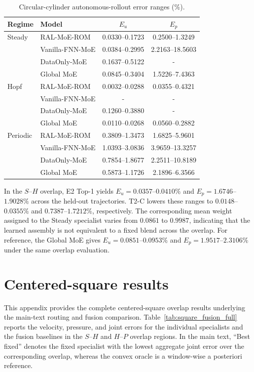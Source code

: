 \documentclass{article}
\begin{document}
\par
\begin{table}[H]
\centering
\caption{Circular-cylinder autonomous-rollout error ranges (\%). }
\label{tab:circular_full}
\small
\setlength{\tabcolsep}{4pt}
\begin{tabular}{llcc}
\toprule
Regime & Model & $E_u$ & $E_p$ \\
\midrule
Steady & RAL-MoE-ROM & 0.0330--0.1723 & 0.2500--1.3249 \\
 & Vanilla-FNN-MoE & 0.0384--0.2995 & 2.2163--18.5603 \\
 & DataOnly-MoE & 0.1637--0.5122 & - \\
 & Global MoE & 0.0845--0.3404 & 1.5226--7.4363 \\
\midrule
Hopf & RAL-MoE-ROM & 0.0032--0.0288 & 0.0355--0.4321 \\
 & Vanilla-FNN-MoE & - & -  \\
 & DataOnly-MoE & 0.1260--0.3880 & - \\
 & Global MoE & 0.0110--0.0268 & 0.0560--0.2882 \\
\midrule
Periodic & RAL-MoE-ROM & 0.3809--1.3473 & 1.6825--5.9601 \\
 & Vanilla-FNN-MoE & 1.0393--3.0836 & 3.9659--13.3257 \\
 & DataOnly-MoE & 0.7854--1.8677 & 2.2511--10.8189 \\
 & Global MoE & 0.5873--1.1726 & 2.1896--6.3566 \\
\bottomrule
\end{tabular}
\end{table}
\par

In the $S$--$H$ overlap, E2 Top-1 yields $E_u=0.0357$--$0.0410\%$ and
$E_p=1.6746$--$1.9028\%$ across the held-out trajectories. T2-C lowers these ranges to $0.0148$--$0.0355\%$ and $0.7387$--$1.7212\%$, respectively. The corresponding mean weight assigned to the Steady specialist varies from $0.0861$ to $0.9987$, indicating that the learned assembly is not equivalent to a fixed blend across the overlap. For reference, the Global MoE gives $E_u=0.0851$--$0.0953\%$ and $E_p=1.9517$--$2.3106\%$ under the same overlap evaluation.

\FloatBarrier
\section{Centered-square results}
\label{app:square}


This appendix provides the complete centered-square overlap results
underlying the main-text routing and fusion comparison. Table~\ref{tab:square_fusion_full} reports the velocity, pressure,
and joint errors for the individual specialists and the fusion baselines in the $S$--$H$ and $H$--$P$ overlap regions. In the main text, ``Best fixed'' denotes the fixed specialist with the
lowest aggregate joint error over the corresponding overlap, whereas the convex oracle is a window-wise a posteriori reference.
\end{document}
